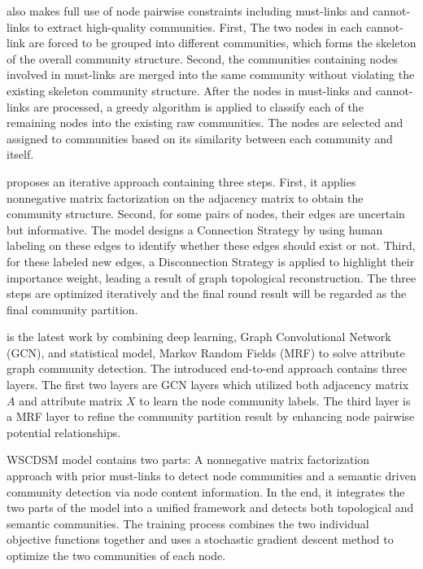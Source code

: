 \cite{cheng2014active} also makes full use of node pairwise constraints including must-links and cannot-links to extract high-quality communities. First, The two nodes in each cannot-link are forced to be grouped into different communities, which forms the skeleton of the overall community structure. Second, the communities containing nodes involved in must-links are merged into the same community without violating the existing skeleton community structure. After the nodes in must-links and cannot-links are processed, a greedy algorithm is applied to classify each of the remaining nodes into the existing raw communities. The nodes are selected and assigned to communities based on its similarity between each community and itself. 

\cite{yang2015active} proposes an iterative approach containing three steps. First, it applies nonnegative matrix factorization on the adjacency matrix to obtain the community structure. Second, for some pairs of nodes, their edges are uncertain but informative. The model designs a Connection Strategy by using human labeling on these edges to identify whether these edges should exist or not. Third, for these labeled new edges, a Disconnection Strategy is applied to highlight their importance weight, leading a result of  graph topological reconstruction. The three steps are optimized iteratively and the final round result will be regarded as the final community partition.

 \cite{jin2019graph} is the latest work by combining deep learning, Graph Convolutional Network (GCN), and statistical model, Markov Random Fields (MRF) to solve attribute graph community detection. The introduced end-to-end approach contains three layers. The first two layers are GCN layers which utilized both adjacency matrix $A$ and attribute matrix $X$ to learn the node community labels. The third layer is a MRF layer to refine the community partition result by enhancing node pairwise potential relationships. 
 
 WSCDSM model \cite{wang2018unified} contains two parts: A nonnegative matrix factorization approach with prior must-links to detect node communities and a semantic driven community detection via node content information. In the end, it integrates the two parts of the model into a unified framework and detects both topological and semantic communities. The training process combines the two individual objective functions together and uses a stochastic gradient descent method to optimize the two communities of each node.
 
